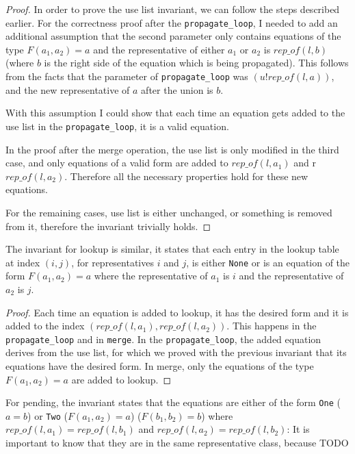 \begin{proof}
In order to prove the use list invariant, we can follow the steps described earlier. For the correctness proof after the \lstinline{propagate_loop}, I needed to add an additional assumption that the second parameter only contains equations of the type $F(a_1, a_2) = a$ and the representative of either $a_1$ or $a_2$ is $rep\_of(l, b)$ (where $b$ is the right side of the equation which is being propagated). This follows from the facts that the parameter of \lstinline{propagate_loop} was $(u ! rep\_of(l, a))$, and the new representative of $a$ after the union is $b$.

With this assumption I could show that each time an equation gets added to the use list in the \lstinline{propagate_loop}, it is a valid equation.

In the proof after the merge operation, the use list is only modified in the third case, and only equations of a valid form are added to $rep\_of(l, a_1)$  and r$rep\_of(l, a_2)$. Therefore all the necessary properties hold for these new equations.

For the remaining cases, use list is either unchanged, or something is removed from it, therefore the invariant trivially holds.
\end{proof}

The invariant for lookup is similar, it states that each entry in the lookup table at index $(i, j)$, for representatives $i$ and $j$, is either \lstinline{None} or is an equation of the form $F(a_1, a_2) = a$ where the representative of $a_1$ is $i$ and the representative of $a_2$  is $j$.

\begin{proof}
Each time an equation is added to lookup, it has the desired form and it is added to the index $(rep\_of(l, a_1), rep\_of(l, a_2))$. This happens in the \lstinline{propagate_loop} and in \lstinline{merge}. In the \lstinline{propagate_loop}, the added equation derives from the use list, for which we proved with the previous invariant that its equations have the desired form. In merge, only the equations of the type $F(a_1, a_2) = a$ are added to lookup.
\end{proof}

For pending, the invariant states that the equations are either of the form \lstinline{One} ($a = b$) or \lstinline{Two} ($F(a_1, a_2) = a$) ($F(b_1, b_2) = b$) where $rep\_of(l, a_1) = rep\_of(l, b_1)$ and $rep\_of(l, a_2) = rep\_of(l, b_2)$: It is important to know that they are in the same representative class, because TODO


